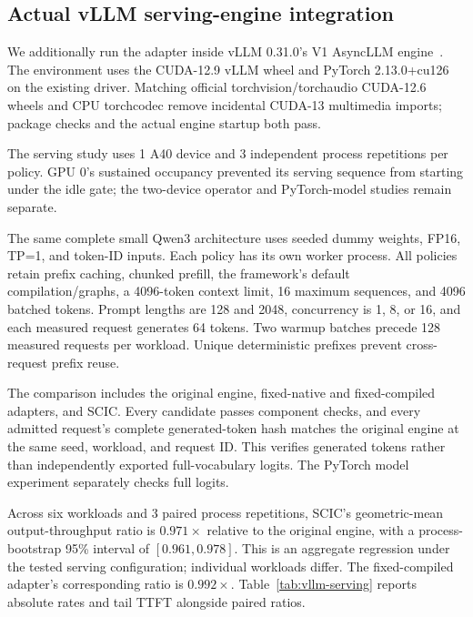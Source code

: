\subsection{Actual vLLM serving-engine integration}

\label{sec:vllm-system}

We additionally run the adapter inside vLLM 0.31.0's V1 AsyncLLM engine~\cite{Kwon2023vLLM}. The environment uses the CUDA-12.9 vLLM wheel and PyTorch 2.13.0+cu126 on the existing driver. Matching official torchvision/torchaudio CUDA-12.6 wheels and CPU torchcodec remove incidental CUDA-13 multimedia imports; package checks and the actual engine startup both pass.

The serving study uses 1 A40 device and 3 independent process repetitions per policy. GPU 0's sustained occupancy prevented its serving sequence from starting under the idle gate; the two-device operator and PyTorch-model studies remain separate.

The same complete small Qwen3 architecture uses seeded dummy weights, FP16, TP=1, and token-ID inputs. Each policy has its own worker process. All policies retain prefix caching, chunked prefill, the framework's default compilation/graphs, a 4096-token context limit, 16 maximum sequences, and 4096 batched tokens. Prompt lengths are 128 and 2048, concurrency is 1, 8, or 16, and each measured request generates 64 tokens. Two warmup batches precede 128 measured requests per workload. Unique deterministic prefixes prevent cross-request prefix reuse.

The comparison includes the original engine, fixed-native and fixed-compiled adapters, and SCIC. Every candidate passes component checks, and every admitted request's complete generated-token hash matches the original engine at the same seed, workload, and request ID. This verifies generated tokens rather than independently exported full-vocabulary logits. The PyTorch model experiment separately checks full logits.

Across six workloads and 3 paired process repetitions, SCIC's geometric-mean output-throughput ratio is $0.971\times$ relative to the original engine, with a process-bootstrap 95\% interval of $[0.961,0.978]$. This is an aggregate regression under the tested serving configuration; individual workloads differ. The fixed-compiled adapter's corresponding ratio is $0.992\times$. Table~\ref{tab:vllm-serving} reports absolute rates and tail TTFT alongside paired ratios.

